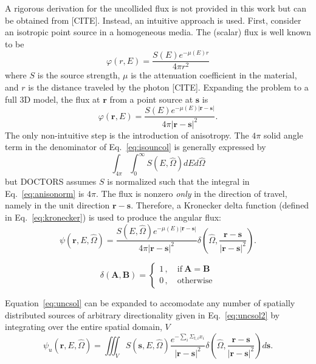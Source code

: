 A rigorous derivation for the uncollided flux is not provided in this work but can be obtained from [CITE]. Instead, an intuitive approach is used. First, consider an isotropic point source in a homogeneous media. The (scalar) flux is well known to be
\begin{equation}
\varphi(r, E) = \frac{S(E) e^{-\mu(E) r}}{4 \pi r^2}
\end{equation}
where $S$ is the source strength, $\mu$ is the attenuation coefficient in the material, and $r$ is the distance traveled by the photon [CITE]. Expanding the problem to a full 3D model, the flux at $\boldsymbol{r}$ from a point source at $\boldsymbol{s}$ is
\begin{equation}\label{eq:isouncol}
\varphi(\boldsymbol{r}, E) = \frac{S(E) e^{-\mu(E) |\boldsymbol{r}-\boldsymbol{s}|}}{4 \pi |\boldsymbol{r}-\boldsymbol{s}|^2}.
\end{equation}
The only non-intuitive step is the introduction of anisotropy. The $4 \pi$ solid angle term in the denominator of Eq.~\ref{eq:isouncol} is generally expressed by
\begin{equation}\label{eq:anisonorm}
\int_{4 \pi}^{} \int_{0}^{\infty} S(E, \hat{\Omega}) dE d\hat{\Omega}
\end{equation}
but DOCTORS assumes $S$ is normalized such that the integral in Eq.~\ref{eq:anisonorm} is $4 \pi$. The flux is nonzero \textit{only} in the direction of travel, namely in the unit direction $\boldsymbol{r} - \boldsymbol{s}$. Therefore, a Kronecker delta function (defined in Eq.~\ref{eq:kronecker}) is used to produce the angular flux:
\begin{equation}\label{eq:uncsol}
\psi(\boldsymbol{r}, E, \hat{\Omega}) = \frac{S(E, \hat{\Omega}) e^{-\mu(E) |\boldsymbol{r}-\boldsymbol{s}|}}{4 \pi |\boldsymbol{r}-\boldsymbol{s}|^2} \delta \left( \hat{\Omega}, \frac{\boldsymbol{r} - \boldsymbol{s}}{|\boldsymbol{r} - \boldsymbol{s}|^2}\right).
\end{equation}

\begin{equation} \label{eq:kronecker}
\delta(\boldsymbol{A}, \boldsymbol{B}) = 
\begin{cases}
1 \,, \quad \mathrm{if} \ \boldsymbol{A}=\boldsymbol{B} \\
0 \,, \quad \mathrm{otherwise}
\end{cases}
\end{equation}

Equation~\ref{eq:uncsol} can be expanded to accomodate any number of spatially distributed sources of arbitrary directionality given in Eq.~\ref{eq:uncsol2} by integrating over the entire spatial domain, $V$
\begin{equation} \label{eq:uncsol2}
\psi_u(\boldsymbol{r}, E, \hat{\Omega}) = \iiint_{V}
S(\boldsymbol{s}, E, \hat{\Omega})
\frac{e^{-\sum_i \Sigma_{t,i} x_i}}{|\boldsymbol{r}-\boldsymbol{s}|^2}
\delta\left( \hat{\Omega}, \frac{\boldsymbol{r}-\boldsymbol{s}}{|\boldsymbol{r}-\boldsymbol{s}|^2}\right)
d \boldsymbol{s}.
\end{equation}


